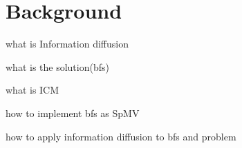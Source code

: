 \chapter{Background} \label{background}

\begin{list_type}  
\item what is Information diffusion
\item what is the solution(bfs)
\item what is ICM
\item how to implement bfs as SpMV
\item how to apply information diffusion to bfs and problem
\item 
\end{list_type}